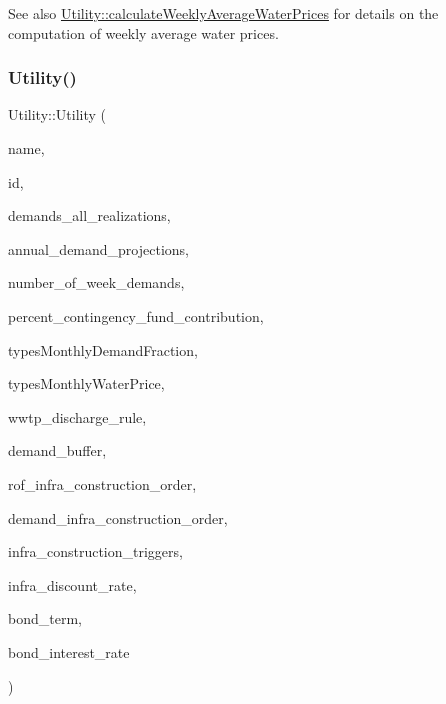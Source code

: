 \begin{DoxySeeAlso}{See also}
\mbox{\hyperlink{classUtility_a0189edb631c9596f094b15afeeb934fd}{Utility\+::calculate\+Weekly\+Average\+Water\+Prices}} for details on the computation of weekly average water prices. 
\end{DoxySeeAlso}
\mbox{\label{classUtility_a919917c54f726067d3666f22b1e98a3f}} 
\subsubsection{\texorpdfstring{Utility()}{Utility()}\hspace{0.1cm}{\footnotesize\ttfamily [2/5]}}
{\footnotesize\ttfamily Utility\+::\+Utility (\begin{DoxyParamCaption}\item[{const char $\ast$}]{name,  }\item[{int}]{id,  }\item[{vector$<$ vector$<$ double $>$$>$ \&}]{demands\+\_\+all\+\_\+realizations,  }\item[{vector$<$ double $>$ \&}]{annual\+\_\+demand\+\_\+projections,  }\item[{int}]{number\+\_\+of\+\_\+week\+\_\+demands,  }\item[{const double}]{percent\+\_\+contingency\+\_\+fund\+\_\+contribution,  }\item[{const vector$<$ vector$<$ double $>$$>$ \&}]{types\+Monthly\+Demand\+Fraction,  }\item[{const vector$<$ vector$<$ double $>$$>$ \&}]{types\+Monthly\+Water\+Price,  }\item[{\mbox{\hyperlink{classWwtpDischargeRule}{Wwtp\+Discharge\+Rule}}}]{wwtp\+\_\+discharge\+\_\+rule,  }\item[{double}]{demand\+\_\+buffer,  }\item[{const vector$<$ int $>$ \&}]{rof\+\_\+infra\+\_\+construction\+\_\+order,  }\item[{const vector$<$ int $>$ \&}]{demand\+\_\+infra\+\_\+construction\+\_\+order,  }\item[{const vector$<$ double $>$ \&}]{infra\+\_\+construction\+\_\+triggers,  }\item[{double}]{infra\+\_\+discount\+\_\+rate,  }\item[{double}]{bond\+\_\+term,  }\item[{double}]{bond\+\_\+interest\+\_\+rate }\end{DoxyParamCaption})}



